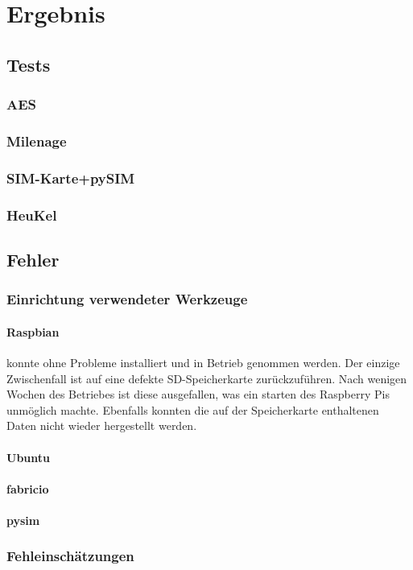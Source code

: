 \section{Ergebnis}
	\subsection{Tests}
		\subsubsection{AES}
		\subsubsection{Milenage}
		\subsubsection{SIM-Karte+pySIM}
		\subsubsection{HeuKel}
	\subsection{Fehler}
		\subsubsection{Einrichtung verwendeter Werkzeuge}
			\paragraph{Raspbian} konnte ohne Probleme installiert und in
			Betrieb genommen werden. Der einzige Zwischenfall ist auf eine
			defekte SD-Speicherkarte zurückzuführen. Nach wenigen Wochen
			des Betriebes ist diese ausgefallen, was ein starten des
			Raspberry Pis unmöglich machte. Ebenfalls konnten die auf der
			Speicherkarte enthaltenen Daten nicht wieder hergestellt werden.
			\paragraph{Ubuntu}
			\paragraph{fabricio}
			\paragraph{pysim}
		\subsubsection{Fehleinschätzungen}
\clearpage